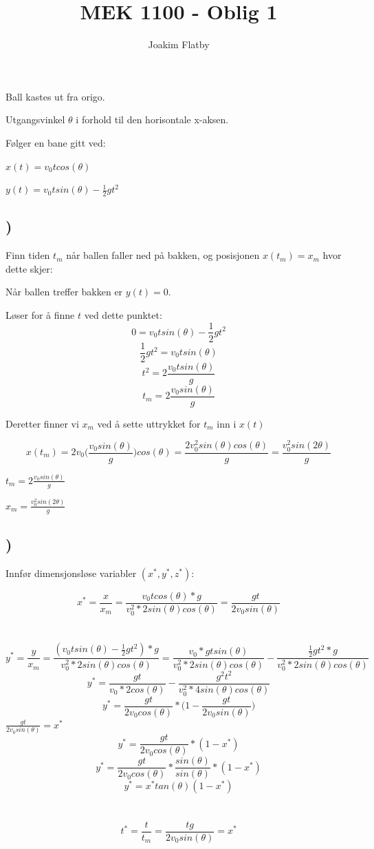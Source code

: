 \documentclass[a4paper,10pt,norsk]{article}
\title{MEK 1100 - Oblig 1}
\author{Joakim Flatby}
\begin{document}
\maketitle

\section{}

Ball kastes ut fra origo.

Utgangsvinkel $\theta$ i forhold til den horisontale x-aksen.

Følger en bane gitt ved:

$x(t) = v_{0} t cos(\theta)$

$y(t) = v_{0} t sin(\theta) - \frac{1}{2}gt^{2}$

\subsection{)}
Finn tiden $t_{m}$ når ballen faller ned på bakken, og posisjonen $x(t_{m}) = x_{m}$ hvor dette skjer:

Når ballen treffer bakken er $y(t) = 0$.

Løser for å finne $t$ ved dette punktet:
\[0 = v_{0} t sin(\theta) - \frac{1}{2}gt^{2}\]
\[\frac{1}{2}gt^{2} = v_{0} t sin(\theta)\]
\[t^{2} = 2\frac{v_{0}tsin(\theta)}{g}\]
\[t_{m} = 2\frac{v_{0}sin(\theta)}{g}\]

Deretter finner vi $x_{m}$ ved å sette uttrykket for $t_{m}$ inn i $x(t)$

\[x(t_{m}) = 2v_{0}\Big( \frac{v_{0}sin(\theta)}{g} \Big) cos(\theta) = \frac{2v_{0}^{2}sin(\theta)cos(\theta)}{g} = \frac{v_{0}^{2}sin(2\theta)}{g}\]

$t_{m} = 2\frac{v_{0}sin(\theta)}{g}$

$x_{m} = \frac{v_{0}^{2}sin(2\theta)}{g}$

\subsection{)}
Innfør dimensjonsløse variabler $(x^{*}, y^{*}, z^{*})$:

\[x^{*} = \frac{x}{x_{m}} = \frac{v_{0}t cos(\theta) * g}{v_{0}^{2} * 2sin(\theta)cos(\theta)} = \frac{gt}{2v_{0}sin(\theta)}\]
\\ \\
\[y^{*} = \frac{y}{x_{m}} = \frac{(v_{0}t sin(\theta) - \frac{1}{2}gt^{2}) * g}{v_{0}^{2} * 2sin(\theta)cos(\theta)} = \frac{v_{0} * g t sin(\theta)}{v_{0}^{2} * 2sin(\theta)cos(\theta)} - \frac{\frac{1}{2}gt^{2} * g}{v_{0}^{2} * 2sin(\theta)cos(\theta)}\]
\[y^{*} = \frac{gt}{v_{0} * 2cos(\theta)} - \frac{g^{2}t^{2}}{v_{0}^{2} * 4sin(\theta)cos(\theta)}\]
\[y^{*} = \frac{gt}{2v_{0}cos(\theta)} * \Big(1 - \frac{gt}{2v_{0}sin(\theta)}\Big)\]
$\frac{gt}{2v_{0}sin(\theta)} = x^{*}$
\[y^{*} = \frac{gt}{2v_{0}cos(\theta)} * (1 - x^{*})\]
\[y^{*} = \frac{gt}{2v_{0}cos(\theta)} * \frac{sin(\theta)}{sin(\theta)} * (1 - x^{*})\]
\[y^{*} = x^{*}tan(\theta)(1 - x^{*})\]
\\ \\
\[t^{*} = \frac{t}{t_{m}} = \frac{tg}{2v_{0}sin(\theta)} = x^{*}\]
\end{document}
